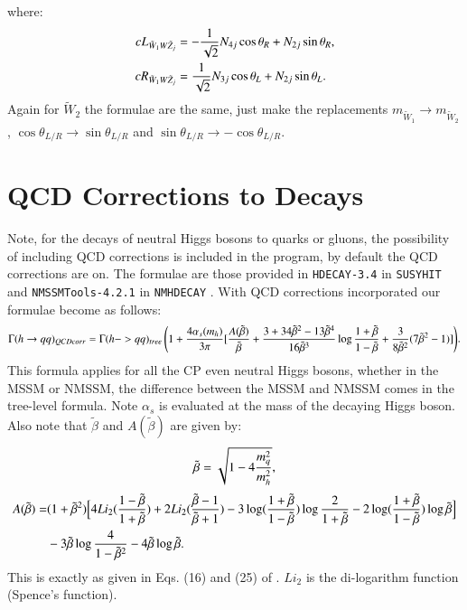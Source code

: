 \documentclass[final,3p,times,pdflatex]{elsarticle}
\begin{document}
where:
\begin{align}
{cL}_{\tilde{W}_1 W \tilde{Z}_j} &= -{1 \over \sqrt{2}} N_{4j}\cos\theta_R + N_{2j}\sin\theta_R, \\
{cR}_{\tilde{W}_1 W \tilde{Z}_j} &= {1 \over \sqrt{2}} N_{3j}\cos\theta_L + N_{2j}\sin\theta_L.
\end{align}
Again for $\tilde{W}_2$ the formulae are the same, just make the replacements $m_{\tilde{W}_1} \rightarrow m_{\tilde{W}_2}$, $\cos\theta_{L/R} \rightarrow \sin\theta_{L/R}$ and $\sin\theta_{L/R} \rightarrow -\cos\theta_{L/R}$.

\section{QCD Corrections to Decays} \label{appendix:QCDcorrdec}
Note, for the decays of neutral Higgs bosons to quarks or gluons, the possibility of including QCD corrections is included in the program, by default the QCD corrections are on. The formulae are those provided in {\tt HDECAY-3.4} in {\tt SUSYHIT} \cite{Djouadi:2006bz,Djouadi:1997yw} and {\tt NMSSMTools-4.2.1} in {\tt NMHDECAY} \cite{Ellwanger:2004xm,Ellwanger:2006ch}. With QCD corrections incorporated our formulae become as follows:
\begin{equation} \label{hqqQCDcorr}
\begin{aligned}
\Gamma(h \rightarrow qq)_{QCDcorr}= \Gamma(h-> qq)_{tree} \left(1 + {4 \alpha_s(m_h) \over 3 \pi} [{A(\tilde{\beta}) \over \tilde{\beta}} + {3 + 34 \tilde{\beta}^2 - 13 \tilde{\beta}^4 \over 16 \tilde{\beta}^3} \log{1+\tilde{\beta} \over 1 - \tilde{\beta}} + {3 \over 8 \tilde{\beta}^2} (7 \tilde{\beta}^2 - 1)]\right)
\end{aligned}.
\end{equation}
This formula applies for all the CP even neutral Higgs bosons, whether in the MSSM or NMSSM, the difference between the MSSM and NMSSM comes in the tree-level formula. Note $\alpha_s$ is evaluated at the mass of the decaying Higgs boson. Also note that $\tilde{\beta}$ and $A(\tilde{\beta})$ are given by:
\begin{equation}
\tilde{\beta} = \sqrt{1 - 4{m_{q}^2 \over m_{h}^2}},
\end{equation}
\begin{equation}
\begin{aligned}
A(\tilde{\beta}) = & (1+\tilde{\beta}^2)\Big[4Li_2 ({1-\tilde{\beta} \over 1+\tilde{\beta}}) + 2Li_2 ({\tilde{\beta}-1  \over \tilde{\beta}+1}) - 3\log({1+\tilde{\beta} \over 1-\tilde{\beta}})\log{2\over 1+\tilde{\beta}} - 2\log({1+\tilde{\beta} \over 1-\tilde{\beta}})\log\tilde{\beta}\Big] \\ & - 3\tilde{\beta} \log{4 \over 1-\tilde{\beta}^2} - 4\tilde{\beta} \log\tilde{\beta}.
\end{aligned}
\end{equation}
This is exactly as given in Eqs. (16) and (25) of \cite{Spira:2016}. $Li_2$ is
the di-logarithm function (Spence's function). 
\end{document}
